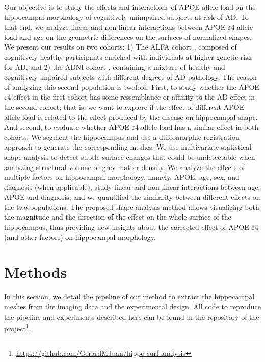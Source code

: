 Our objective is to study the effects and interactions of APOE allele load on the hippocampal morphology of cognitively unimpaired subjects at risk of AD. To that end, we analyze linear and non-linear interactions between APOE $\varepsilon$4 allele load and age on the geometric differences on the surfaces of normalized shapes. We present our results on two cohorts: 1) The ALFA cohort \cite{Molinuevo2016}, composed of cognitively healthy participants enriched with individuals at higher genetic risk for AD, and 2) the ADNI cohort \cite{Mueller2005}, containing a mixture of healthy and cognitively impaired subjects with different degrees of AD pathology. The reason of analyzing this second population is twofold. First, to study whether the APOE $\varepsilon$4 effect in the first cohort has some ressemblance or affinity to the AD effect in the second cohort; that is, we want to explore if the effect of different APOE allele load is related to the effect produced by the disease on hippocampal shape. And second, to evaluate whether APOE $\varepsilon$4 allele load has a similar effect in both cohorts. We segment the hippocampus and use a diffeomorphic registration approach to generate the corresponding meshes. We use multivariate statistical shape analysis to detect subtle surface changes that could be undetectable when analyzing structural volume or grey matter density. We analyze the effects of multiple factors on hippocampal morphology, namely, APOE, age, sex, and diagnosis (when applicable), study linear and non-linear interactions between age, APOE and diagnosis, and we quantified the similarity between different effects on the two populations. The proposed shape analysis method allows visualizing both the magnitude and the direction of the effect on the whole surface of the hippocampus, thus providing new insights about the corrected effect of APOE $\varepsilon$4 (and other factors) on hippocampal morphology.  \\

\section{Methods}
\label{sec:methods}

In this section, we detail the pipeline of our method to extract the hippocampal meshes from the imaging data and the experimental design. All code to reproduce the pipeline and experiments described here can be found in the repository of the project\footnote{\url{https://github.com/GerardMJuan/hippo-surf-analysis}}.


